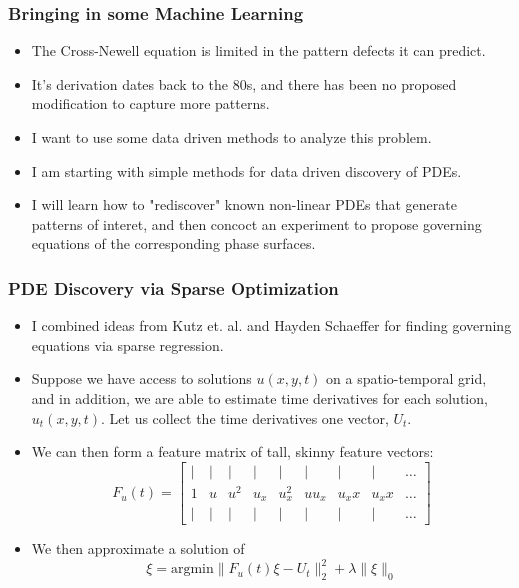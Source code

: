 \documentclass[]{beamer}
\begin{document}
\begin{frame}
     \frametitle{Bringing in some Machine Learning}
     \begin{itemize}
         \item The Cross-Newell equation is limited in the pattern defects it can predict.
        \item It's derivation dates back to the 80s, and there has been no proposed modification to capture more patterns.
        \item I want to use some data driven methods to analyze this problem.
        \item I am starting with simple methods for data driven discovery of PDEs.
        \item I will learn how to "rediscover" known non-linear PDEs that generate patterns of interet, and then concoct an experiment to propose governing equations of the corresponding phase surfaces.
     \end{itemize}
\end{frame}

\begin{frame}
    \frametitle{PDE Discovery via Sparse Optimization}
\begin{itemize}
  \item I combined ideas from Kutz et. al. and Hayden Schaeffer for finding governing equations via sparse regression.
  \item Suppose we have access to solutions $u(x,y,t)$ on a spatio-temporal grid, and in addition, we are able to estimate time derivatives for each solution, $u_t(x,y,t)$. Let us collect the time derivatives one vector, $U_t$.
\item 
    We can then form a feature matrix of tall, skinny feature vectors:
    \[
        F_u(t) = \begin{bmatrix}| & | & | & | & | & | & | & | & \dots\\
            1 & u & u^2 & u_x & u_x^2 & uu_x & u_xx & u_xx & \dots\\
                                | & | & | & | & | & | & | & | & \dots
                 \end{bmatrix}
    \] 
\item 
    We then approximate a solution of
    \[
        \xi = \text{argmin}\|F_u(t)\xi - U_t\|_2^2 + \lambda \|\xi\|_0
    \] 
\end{itemize}
\end{frame}
\end{document}
